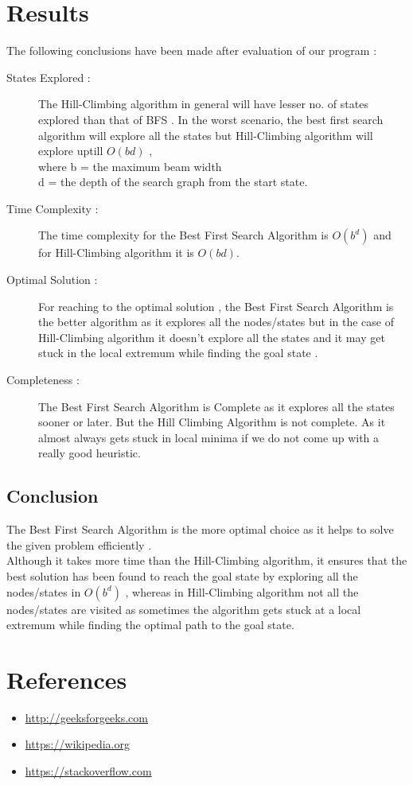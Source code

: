 \documentclass{article}
\begin{document}
\section{Results}
\vspace{20pt}
The following conclusions have been made after evaluation of our program :
\begin{description}
    \item[States Explored :]The Hill-Climbing algorithm in general will have lesser no. of states explored than that of BFS .
    In the worst scenario, the best first search algorithm will explore all the states but Hill-Climbing algorithm will explore uptill $O(bd)$ 
    ,\\ where b = the maximum beam width 
    \\\hspace*{29pt}d = the depth of the search graph from the start state.
    \item[Time Complexity :] The time complexity for the Best First Search Algorithm is $O(b^d)$ and for Hill-Climbing algorithm it is $O(bd)$.
    \item[Optimal Solution :] For reaching to the optimal solution , the Best First Search Algorithm is the better algorithm as it explores all the nodes/states
    but in the case of Hill-Climbing algorithm it doesn't explore all the states and it may get stuck in the local extremum while finding the goal state . 
    \item[Completeness :] The Best First Search Algorithm is Complete as it explores all the states sooner or later. But the Hill Climbing Algorithm is not complete. As it almost always gets stuck in local minima if we do not come up with a really good heuristic.
\end{description}
\vspace{20pt}
\subsection*{Conclusion}
The Best First Search Algorithm is the more optimal choice as it helps to solve the given problem
efficiently . 
\vspace{5pt}
\\Although it takes more time than the Hill-Climbing algorithm, it ensures that the best solution
has been found to reach the goal state by exploring all the nodes/states in $O(b^d)$ , whereas in Hill-Climbing algorithm
not all the nodes/states are visited as sometimes the algorithm gets stuck at a local extremum while finding the optimal path to the goal state.
\newpage
\section{References}
\vspace{30pt}
\begin{itemize}
    \item \url{http://geeksforgeeks.com}
    \item \url{https://wikipedia.org}
    \item \url{https://stackoverflow.com}
\end{itemize}
\end{document}

